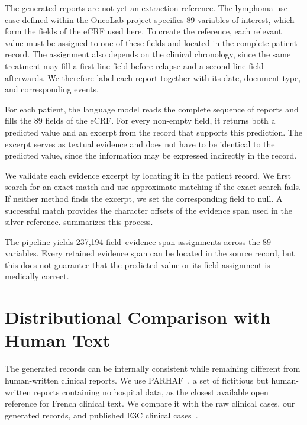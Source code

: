 The generated reports are not yet an extraction reference. The lymphoma use case
defined within the OncoLab project specifies 89 variables of interest, which
form the fields of the eCRF used here. To create the reference, each relevant
value must be assigned to one of these fields and located in the complete patient
record. The assignment also depends on the clinical chronology, since the same
treatment may fill a first-line field before relapse and a second-line field
afterwards. We therefore label each report together with its date, document type,
and corresponding events.

For each patient, the language model reads the complete sequence of reports and
fills the 89 fields of the eCRF. For every non-empty field, it returns both a
predicted value and an excerpt from the record that supports this prediction.
The excerpt serves as textual evidence and does not have to be identical to the
predicted value, since the information may be expressed indirectly in the
record.

We validate each evidence excerpt by locating it in the patient record. We first
search for an exact match and use approximate matching if the exact search fails.
If neither method finds the excerpt, we set the corresponding field to null. A
successful match provides the character offsets of the evidence span used in the
silver reference.  summarizes this process.



The pipeline yields 237,194 field--evidence span assignments across the 89
variables. Every retained evidence span can be located in the source record, but
this does not guarantee that the predicted value or its field assignment is
medically correct.


\section{Distributional Comparison with Human Text}
\label{sec:stylometry}

The generated records can be internally consistent while remaining different
from human-written clinical reports. We use PARHAF~\citep{tannier_parhaf_2026},
a set of fictitious but human-written reports containing no hospital data, as
the closest available open reference for French clinical text. We compare it
with the raw clinical cases, our generated records, and published E3C clinical
cases~\citep{magnini_e3c_2021}.

